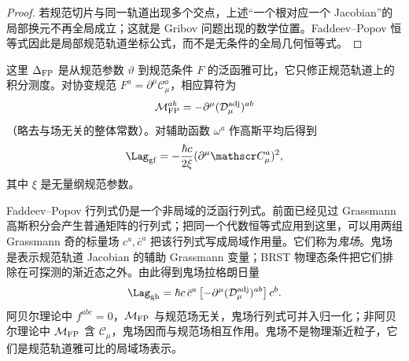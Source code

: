 \begin{proof}
若规范切片与同一轨道出现多个交点，上述“一个根对应一个 Jacobian”的局部换元不再全局成立；这就是 Gribov 问题出现的数学位置。Faddeev--Popov 恒等式因此是局部规范轨道坐标公式，而不是无条件的全局几何恒等式。
\end{proof}

这里 $\Delta_{\rm FP}$ 是从规范参数 $\vartheta$ 到规范条件 $F$ 的泛函雅可比，它只修正规范轨道上的积分测度。对协变规范 $F^a=\partial^\mu\mathscr C_\mu^a$，相应算符为
\begin{equation*}
 \mathcal M_{\rm FP}^{ab}
 =-\partial^\mu(\mathcal D_\mu^{\rm adj})^{ab}
\end{equation*}
（略去与场无关的整体常数）。对辅助函数 $\omega^a$ 作高斯平均后得到
\begin{equation}
 {
 \Lag_{\rm gf}
 =-\frac{\hbar c}{2\xi}
 (\partial^\mu\mathscr C_\mu^a)^2,}
 \label{eq:general-covariant-gf-dp11}
\end{equation}
其中 $\xi$ 是无量纲规范参数。

Faddeev--Popov 行列式仍是一个非局域的泛函行列式。前面已经见过 Grassmann 高斯积分会产生普通矩阵的行列式；把同一个代数恒等式应用到这里，可以用两组 Grassmann 奇的标量场 $c^a,\bar c^a$ 把该行列式写成局域作用量。它们称为\emph{鬼场}。鬼场是表示规范轨道 Jacobian 的辅助 Grassmann 变量；BRST 物理态条件把它们排除在可探测的渐近态之外。由此得到鬼场拉格朗日量
\begin{equation}
 {
 \Lag_{\rm gh}
 =\hbar c\,\bar c^a
 \left[-\partial^\mu(\mathcal D_\mu^{\rm adj})^{ab}\right]c^b.}
 \label{eq:general-ghost-lagrangian-dp11}
\end{equation}
阿贝尔理论中 $f^{abc}=0$，$\mathcal M_{\rm FP}$ 与规范场无关，鬼场行列式可并入归一化；非阿贝尔理论中 $\mathcal M_{\rm FP}$ 含 $\mathscr C_\mu$，鬼场因而与规范场相互作用。鬼场不是物理渐近粒子，它们是规范轨道雅可比的局域场表示。

